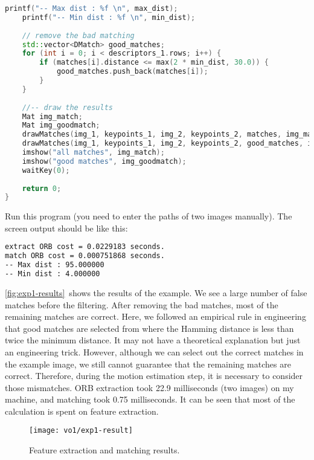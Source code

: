 \begin{lstlisting}[language=c++,caption=slambook2/ch7/orb_cv.cpp]
	printf("-- Max dist : %f \n", max_dist);
	printf("-- Min dist : %f \n", min_dist);
	
	// remove the bad matching
	std::vector<DMatch> good_matches;
	for (int i = 0; i < descriptors_1.rows; i++) {
		if (matches[i].distance <= max(2 * min_dist, 30.0)) {
			good_matches.push_back(matches[i]);
		}
	}
	
	//-- draw the results
	Mat img_match;
	Mat img_goodmatch;
	drawMatches(img_1, keypoints_1, img_2, keypoints_2, matches, img_match);
	drawMatches(img_1, keypoints_1, img_2, keypoints_2, good_matches, img_goodmatch);
	imshow("all matches", img_match);
	imshow("good matches", img_goodmatch);
	waitKey(0);
	
	return 0;
}
\end{lstlisting}

Run this program (you need to enter the paths of two images manually). The screen output should be like this:
\begin{lstlisting}[language=sh,caption=Terminal input:]
% build/orb_cv 1.png 2.png
extract ORB cost = 0.0229183 seconds. 
match ORB cost = 0.000751868 seconds.
-- Max dist : 95.000000 
-- Min dist : 4.000000 
\end{lstlisting}

\autoref{fig:exp1-results}~shows the results of the example. We see a large number of false matches before the filtering. After removing the bad matches, most of the remaining matches are correct. Here, we followed an empirical rule in engineering that good matches are selected from where the Hamming distance is less than twice the minimum distance. It may not have a theoretical explanation but just an engineering trick. However, although we can select out the correct matches in the example image, we still cannot guarantee that the remaining matches are correct. Therefore, during the motion estimation step, it is necessary to consider those mismatches. ORB extraction took 22.9 milliseconds (two images) on my machine, and matching took 0.75 milliseconds. It can be seen that most of the calculation is spent on feature extraction.

\begin{figure}[!htp]
	\centering
	\texttt{[image: vo1/exp1-result]}
	\caption{Feature extraction and matching results.}
	\label{fig:exp1-results} 
\end{figure}

